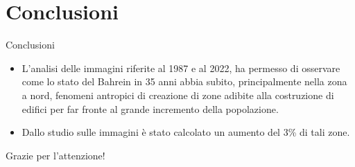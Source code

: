 \documentclass{beamer}
\begin{document}
\section{Conclusioni}
\begin{frame}{Conclusioni}
\begin{itemize}
\item L'analisi delle immagini riferite al 1987 e al 2022, ha permesso di osservare come lo stato del Bahrein in 35 anni abbia subito, principalmente nella zona a nord, fenomeni antropici di creazione di zone adibite alla costruzione di edifici per far fronte al grande incremento della popolazione.
\bigskip
\item Dallo studio sulle immagini è stato calcolato un aumento del 3\% di tali zone.
\end{itemize}{}
\end{frame}

\begin{frame}
\centering
\bigskip
\bigskip
\huge
Grazie per l'attenzione!    
\end{frame}{}
\end{document}
